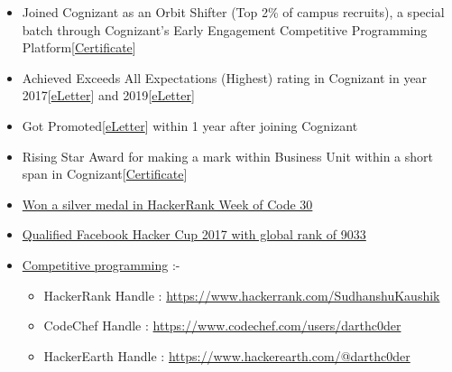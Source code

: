 \documentclass[10pt,a4paper,ragged2e]{altacv}
\begin{document}
\smallskip
\begin{itemize}
\item Joined Cognizant as an Orbit Shifter (Top 2\% of campus recruits), a special batch through Cognizant’s Early Engagement          Competitive Programming Platform[\href{https://www.dropbox.com/s/46gp0t9b6dyp6zo/OrbitShifterCertf.pdf}{Certificate}]
\item Achieved Exceeds All Expectations (Highest) rating in Cognizant in year 2017[\href{https://www.dropbox.com/s/p07fdssbcbyijnm/Eletters_Incentive\%20-\%202017.pdf?dl=0}{eLetter}] and 2019[\href{https://www.dropbox.com/s/mjzlinepjh1m75f/Eletters_Incentive\%20-\%202019.pdf?dl=0}{eLetter}]
\item Got Promoted[\href{https://www.dropbox.com/s/vdj3kfo3ypn50yn/Eletters_Promotion\%20-\%202018.pdf?dl=0}{eLetter}] within 1 year after joining Cognizant
\item Rising Star Award for making a mark within Business Unit within a short span in Cognizant[\href{https://www.dropbox.com/s/pp53covrsp5s2wu/RisingStarAward.pdf}{Certificate}]
\item \href{https://www.hackerrank.com/results/w30/SudhanshuKaushik}{Won a silver medal in HackerRank Week of Code 30}
\item \href{https://www.dropbox.com/s/pdbp1gtypb82c45/Gmail\%20-\%202017\%20Facebook\%20Hacker\%20Cup\%20Round\%201.pdf?dl=0}{Qualified Facebook Hacker Cup 2017 with global rank of 9033}
\item \href{https://www.stopstalk.com/user/profile/darthc0der}{Competitive programming} :-
\begin{itemize}
\item HackerRank Handle : \url{https://www.hackerrank.com/SudhanshuKaushik}
\item CodeChef Handle : \url{https://www.codechef.com/users/darthc0der}
\item HackerEarth Handle : \url{https://www.hackerearth.com/@darthc0der}
\end{itemize}
\end{itemize}

\clearpage

\nocite{*}
\end{document}
